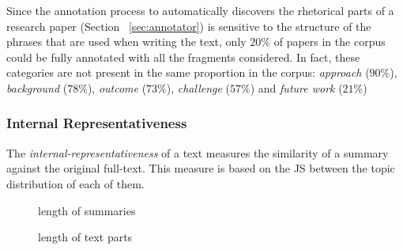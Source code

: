 Since the annotation process to automatically discovers the rhetorical parts of a research paper (Section ~\ref{sec:annotator}) is sensitive to the structure of the phrases that are used when writing the text, only $20\%$ of papers in the corpus could be fully annotated with all the fragments considered. In fact, these categories are not present in the same proportion in the corpus: \textit{approach} ($90\%$), \textit{background} ($78\%$), \textit{outcome} ($73\%$), \textit{challenge} ($57\%$) and \textit{future work} ($21\%$)

\subsubsection{Internal Representativeness}

The \textit{internal-representativeness} of a text measures the similarity of a summary against the original full-text. This measure is based on the JS between the topic distribution of each of them. 

\begin{figure}[!htb]\centering
   \begin{minipage}{0.49\textwidth}
     \caption{length of summaries}\label{fig:size}
   \end{minipage}
   \begin {minipage}[c]{0.49\textwidth}
     \caption{length of text parts}\label{fig:relativeSize}
   \end{minipage}
\end{figure}

